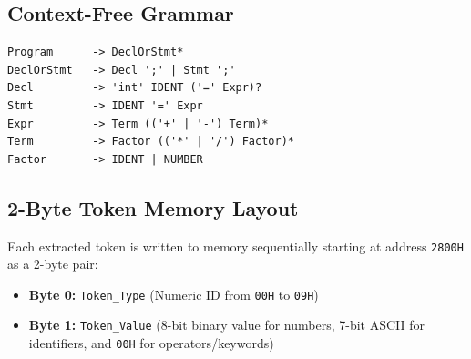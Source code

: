 \documentclass[11pt,a4paper]{article}
\begin{document}
\subsection*{Context-Free Grammar}
\begin{lstlisting}
Program      -> DeclOrStmt*
DeclOrStmt   -> Decl ';' | Stmt ';'
Decl         -> 'int' IDENT ('=' Expr)?
Stmt         -> IDENT '=' Expr
Expr         -> Term (('+' | '-') Term)*
Term         -> Factor (('*' | '/') Factor)*
Factor       -> IDENT | NUMBER
\end{lstlisting}

\subsection*{2-Byte Token Memory Layout}
Each extracted token is written to memory sequentially starting at address \texttt{2800H} as a 2-byte pair:
\begin{itemize}[itemsep=2pt, topsep=2pt]
    \item \textbf{Byte 0:} \texttt{Token\_Type} (Numeric ID from \texttt{00H} to \texttt{09H})
    \item \textbf{Byte 1:} \texttt{Token\_Value} (8-bit binary value for numbers, 7-bit ASCII for identifiers, and \texttt{00H} for operators/keywords)
\end{itemize}
\end{document}
